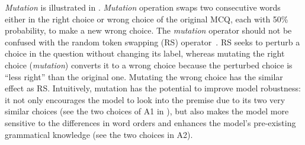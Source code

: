 

\textit{Mutation} is illustrated in . 
\textit{Mutation} operation swaps two consecutive words either in 
the right choice or wrong choice of 
the original MCQ, each with 50\% probability, to make a new wrong choice.
The \textit{mutation} operator should not be confused with the random token
swapping (RS) operator~\cite{artetxe2017unsupervised,lample2017unsupervised}.
RS seeks to perturb a choice in the question without changing its label,
whereas mutating the right choice (\textit{mutation}) converts it to a wrong choice because the 
perturbed choice is ``less right'' than the original one.
Mutating the wrong choice has the similar effect as RS.
Intuitively, mutation has the potential to improve model robustness:
it not only encourages the model to look into the premise due to its
two very similar choices (see the two choices of A1 in ), 
but also makes the model more sensitive to the differences in word orders 
and enhances the model's pre-existing grammatical knowledge (see the two choices in
A2). 


